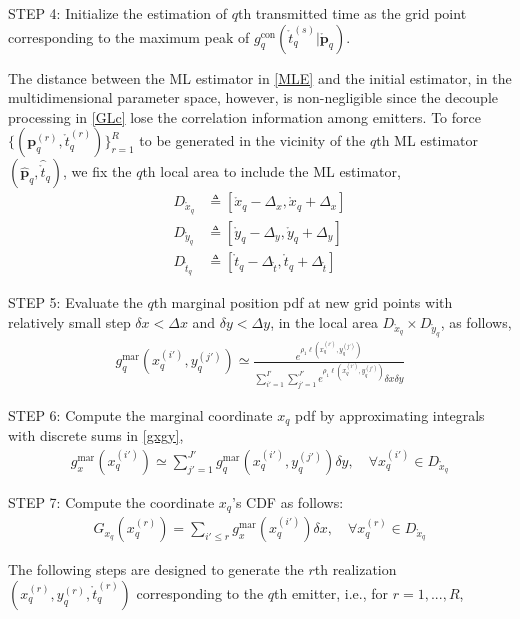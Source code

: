 \documentclass[review]{elsarticle}
\begin{document}
STEP 4: Initialize the estimation of $q$th transmitted time as the grid point corresponding to the maximum peak of $g_{q}^{\text{con}}(\mathring{t}_q^{(s)} \vert \mathring{\boldsymbol{p}}_q)$.

The distance between the ML estimator in \eqref{MLE} and the initial estimator, in the multidimensional parameter space, however, is non-negligible since the decouple processing in \eqref{GLc} lose the correlation information among emitters. To force $\lbrace(\boldsymbol{p}_q^{(r)},\mathring{t}_q^{(r)})\rbrace_{r=1}^{R}$ to be generated in the vicinity of the $q$th ML estimator $(\hat{\boldsymbol{p}}_q,\hat{\mathring{t}}_q)$, we fix the $q$th local area to include the ML estimator,
\begin{align}
    D_{\mathring{x}_q}&\triangleq[\mathring{x}_q-\Delta_x,\mathring{x}_q+\Delta_x]\\
    D_{\mathring{y}_q}&\triangleq[\mathring{y}_q-\Delta_y,\mathring{y}_q+\Delta_y]\\
    D_{\mathring{t}_q}&\triangleq[\mathring{t}_q-\Delta_{\mathring{t}},\mathring{t}_q+\Delta_{\mathring{t}}]
\end{align}

STEP 5: Evaluate the $q$th marginal position pdf at new grid points with relatively small step $\delta x<\Delta x$ and $\delta y<\Delta y$, in the local area $D_{\mathring{x}_q}\times D_{\mathring{y}_q}$, as follows,
\begin{align}
    g_{q}^{\text{mar}}(x_q^{(i')},y_q^{(j')})\simeq\frac{e^{\rho_1\ell (x_q^{(i')},y_q^{(j')})}}{\sum_{i'=1}^{I'}\sum_{j'=1}^{J'}e^{\rho_1\ell (x_q^{(i')},y_q^{(j')})}\delta x\delta y}
\end{align}

STEP 6: Compute the marginal coordinate $x_q$ pdf by approximating integrals with discrete sums in \eqref{gxgy},
\begin{align}
    g_{x}^{\text{mar}}(x_q^{(i')})\simeq \sum_{j'=1}^{J'} g_{q}^{\text{mar}}(x_q^{(i')},y_q^{(j')})\delta y, \quad \forall x_q^{(i')}\in D_{\mathring{x}_q}
\end{align}

STEP 7: Compute the coordinate $x_q$'s CDF as follows:
\begin{align}\label{Gxq}
    G_{x_q}(x_q^{(r)})=\sum_{i'\leq r} g_{x}^{\text{mar}}(x_q^{(i')})\delta x, \quad \forall x_q^{(r)}\in D_{\mathring{x}_q} 
\end{align}

The following steps are designed to generate the $r$th realization $(x_q^{(r)},y_q^{(r)},\mathring{t}_q^{(r)})$ corresponding to the $q$th emitter, i.e., for $r=1,...,R$,
\end{document}
